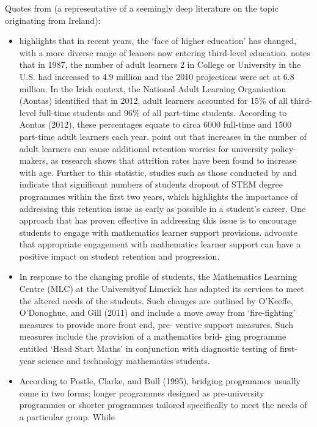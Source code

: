 \documentclass[twoside,12pt,a4paper]{report}
\begin{document}
Quotes from \cite{Johnson2016} (a representative of a seemingly deep literature on the topic originating from Ireland):
\begin{itemize}
	\item \cite{Hardin2008} highlights that in recent years, the ‘face
of higher education’ has changed, with a more diverse range of leaners now entering
third-level education. \cite{Hardin2008} notes that in 1987, the number of adult learners 2
in College or University in the U.S. had increased to 4.9 million and the 2010 projections
were set at 6.8 million. In the Irish context, the National Adult Learning Organisation
(Aontas) identified that in 2012, adult learners accounted for 15\% of all third-level
full-time students and 96\% of all part-time students. According to Aontas (2012), these
percentages equate to circa 6000 full-time and 1500 part-time adult learners each year.
\cite{Murtaugh1999} point out that increases in the number of adult
learners can cause additional retention worries for university policy-makers, as research
shows that attrition rates have been found to increase with age. Further to this statistic,
studies such as those conducted by \cite{House2000} and \cite{Tsui2007} indicate that significant
numbers of students dropout of STEM degree programmes within the first two years,
which highlights the importance of addressing this retention issue as early as possible
in a student’s career. One approach that has proven effective in addressing this issue is
to encourage students to engage with mathematics learner support provisions. \cite{Lee2008}
 advocate that appropriate engagement with mathematics learner support
can have a positive impact on student retention and progression.
	\item In response to the changing profile of students, the Mathematics Learning Centre
(MLC) at the Universityof Limerick has adapted its services to meet the altered needs
of the students. Such changes are outlined by O’Keeffe, O’Donoghue, and Gill (2011)
and include a move away from ‘fire-fighting’ measures to provide more front end, pre-
ventive support measures. Such measures include the provision of a mathematics brid-
ging programme entitled ‘Head Start Maths’ in conjunction with diagnostic testing of
first-year science and technology mathematics students.
	\item According to Postle, Clarke, and Bull (1995), bridging programmes usually come
in two forms; longer programmes designed as pre-university programmes or shorter
programmes tailored specifically to meet the needs of a particular group. While

\end{itemize}
\end{document}
